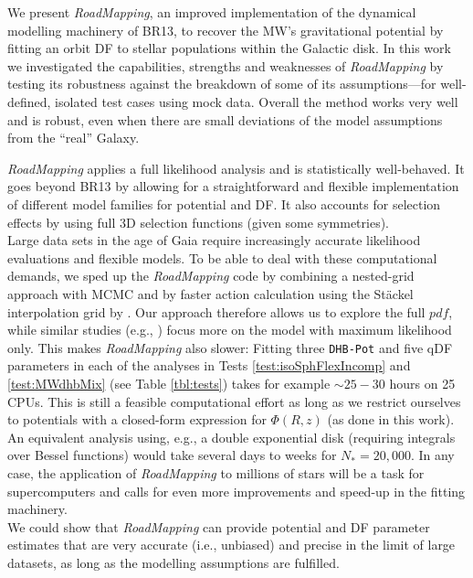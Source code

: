 \documentclass[iop,revtex4,numberedappendix,appendixfloats]{emulateapj}
\newcommand{\pdf}{\ensuremath{pdf}}
\newcommand{\RM}{{\sl RoadMapping}}
\begin{document}
We present \RM{}, an improved implementation of the dynamical modelling machinery of BR13, to recover the MW's gravitational potential by fitting an orbit DF to stellar populations within the Galactic disk. In this work we investigated the capabilities, strengths and weaknesses of \RM{} by testing its robustness against the breakdown of some of its assumptions---for well-defined, isolated test cases using mock data. Overall the method works very well and is robust, even when there are small deviations of the model assumptions from the ``real'' Galaxy.

\RM{} applies a full likelihood analysis and is statistically well-behaved. It goes beyond BR13 by allowing for a straightforward and flexible implementation of different model families for potential and DF. It also accounts for selection effects by using full 3D selection functions (given some symmetries).\\

 Large data sets in the age of Gaia require increasingly accurate likelihood evaluations and flexible models. To be able to deal with these computational demands, we sped up the \RM{} code by combining a nested-grid approach with MCMC and by faster action calculation using the St\"{a}ckel \citep{2012MNRAS.426.1324B} interpolation grid by \citet{2015ApJS..216...29B}. Our approach therefore allows us to explore the full \pdf{}, while similar studies (e.g., \citealt{2014MNRAS.445.3133P,2015MNRAS.449.3479S,2016arXiv160309332D}) focus more on the model with maximum likelihood only. This makes \RM{} also slower: Fitting three \texttt{DHB-Pot} and five qDF parameters in each of the analyses in Tests \ref{test:isoSphFlexIncomp} and \ref{test:MWdhbMix} (see Table \ref{tbl:tests}) takes for example $\sim 25-30$ hours on 25 CPUs. This is still a feasible computational effort as long as we restrict ourselves to potentials with a closed-form expression for $\Phi(R,z)$ (as done in this work). An equivalent analysis using, e.g., a double exponential disk (requiring integrals over Bessel functions) would take several days to weeks for $N_*=20,000$. In any case, the application of \RM{} to millions of stars will be a task for supercomputers and calls for even more improvements and speed-up in the fitting machinery.\\

 We could show that \RM{} can provide potential and DF parameter estimates that are very accurate (i.e., unbiased) and precise in the limit of large datasets, as long as the modelling assumptions are fulfilled.
\end{document}
